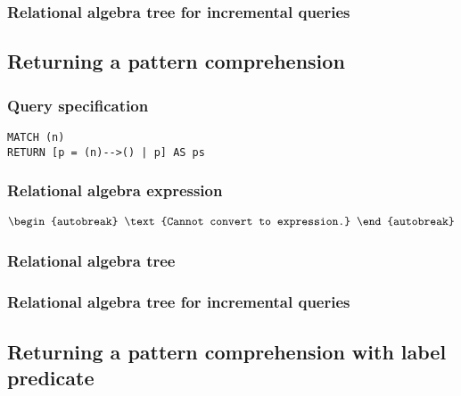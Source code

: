 
\subsubsection*{Relational algebra tree for incremental queries}


\subsection{Returning a pattern comprehension}

\subsubsection*{Query specification}

\begin{lstlisting}
MATCH (n)
RETURN [p = (n)-->() | p] AS ps
\end{lstlisting}

\subsubsection*{Relational algebra expression}

\begin{align*}
\begin{autobreak}
\text{Cannot convert to expression.}
\end{autobreak}
\end{align*}

\subsubsection*{Relational algebra tree}


\subsubsection*{Relational algebra tree for incremental queries}


\subsection{Returning a pattern comprehension with label predicate}

